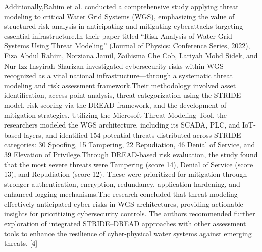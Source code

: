 \documentclass[12pt,a4paper]{report}
\begin{document}
Additionally,Rahim et al. conducted a comprehensive study applying threat modeling to critical Water Grid Systems (WGS), emphasizing the value of structured risk analysis in anticipating and mitigating cyberattacks targeting essential infrastructure.In their paper titled “Risk Analysis of Water Grid Systems Using Threat Modeling” (Journal of Physics: Conference Series, 2022), Fiza Abdul Rahim, Norziana Jamil, Zaihisma Che Cob, Lariyah Mohd Sidek, and Nur Izz Insyirah Sharizan investigated cybersecurity risks within WGS—recognized as a vital national infrastructure—through a systematic threat modeling and risk assessment framework.Their methodology involved asset identification, access point analysis, threat categorization using the STRIDE model, risk scoring via the DREAD framework, and the development of mitigation strategies. Utilizing the Microsoft Threat Modeling Tool, the researchers modeled the WGS architecture, including its SCADA, PLC, and IoT-based layers, and identified 154 potential threats distributed across STRIDE categories: 30 Spoofing, 15 Tampering, 22 Repudiation, 46 Denial of Service, and 39 Elevation of Privilege.Through DREAD-based risk evaluation, the study found that the most severe threats were Tampering (score 14), Denial of Service (score 13), and Repudiation (score 12). These were prioritized for mitigation through stronger authentication, encryption, redundancy, application hardening, and enhanced logging mechanisms.The research concluded that threat modeling effectively anticipated cyber risks in WGS architectures, providing actionable insights for prioritizing cybersecurity controls. The authors recommended further exploration of integrated STRIDE–DREAD approaches with other assessment tools to enhance the resilience of cyber-physical water systems against emerging threats. [4]
\end{document}
